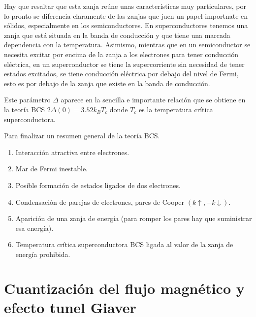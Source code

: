 Hay que resaltar que esta zanja reúne unas características muy particulares, por lo pronto se diferencia claramente de las zanjas que juen un papel importnate en sólidos, especialmente en los semiconductores. En superconductores tenemos una zanja que está situada en la banda de conducción y que tiene una marcada dependencia con la temperatura. Asimismo, mientras que en un semiconductor se necesita excitar por encima de la zanja a los electrones para tener conducción eléctrica, en un superconductor se tiene la supercorriente sin necesidad de tener estados excitados, se tiene conducción eléctrica por debajo del nivel de Fermi, esto es por debajo de la zanja que existe en la banda de conducción.

Este parámetro $\Delta$ aparece en la sencilla e importante relación que se obtiene en la teoría BCS $2 \Delta(0) = 3.52 k_B T_c$ donde $T_c$ es la temperatura crítica superconductora.

Para finalizar un resumen general de la teoría BCS.

\begin{enumerate}
    \item Interacción atractiva entre electrones.
    \item Mar de Fermi inestable.
    \item Posible formación de estados ligados de dos electrones.
    \item Condensación de parejas de electrones, pares de Cooper $(k \uparrow, -k \downarrow)$.
    \item Aparición de una zanja de energía (para romper los pares hay que suministrar esa energía).
    \item Temperatura crítica superconductora BCS ligada al valor de la zanja de energía prohibida.
\end{enumerate}

\section{Cuantización del flujo magnético y efecto tunel Giaver}

